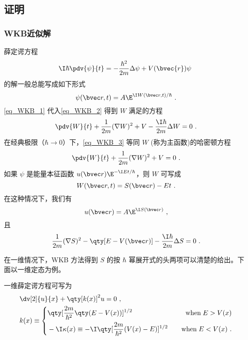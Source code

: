 \subsection{证明}
\subsubsection{WKB近似解}
薛定谔方程
\begin{equation}\label{eq_WKB_2}
\I\hbar\pdv{\psi}{t}=-\frac{\hbar^2}{2m}\Delta\psi+V(\bvec{r})\psi~
\end{equation}
的解一般总能写成如下形式
\begin{equation}\label{eq_WKB_1}
\psi(\bvec r,t)=A\E^{\I W(\bvec r,t)/\hbar}~.
\end{equation}
\autoref{eq_WKB_1} 代入\autoref{eq_WKB_2} 得到 $W$ 满足的方程
\begin{equation}\label{eq_WKB_3}
\pdv{W}{t}+\frac{1}{2m}(\nabla W)^2+V-\frac{\I\hbar}{2m}\Delta W=0~.
\end{equation}
在经典极限（$\hbar\rightarrow 0$）下，\autoref{eq_WKB_3} 等同 $W$ (称为主函数)的哈密顿方程
\begin{equation}
\pdv{W}{t}+\frac{1}{2m}(\nabla W)^2+V=0~.
\end{equation}
如果 $\psi$ 是能量本征函数 $u(\bvec r)\E^{-\I Et/\hbar}$，则 $W$ 可写成
\begin{equation}
W(\bvec r,t)=S(\bvec r)-Et~.
\end{equation}
在这种情况下，我们有
\begin{equation}
u(\bvec r)=A\E^{\I S(\bvec r)}~,
\end{equation}
且
\begin{equation}
\frac{1}{2m}(\nabla S)^2-\qty[E-V(\bvec r)]-\frac{\I\hbar}{2m}\Delta S=0~.
\end{equation}

在一维情况下，WKB 方法得到 $S$ 的按 $\hbar$ 幂展开式的头两项可以清楚的给出。下面以一维定态为例。

一维薛定谔方程可写为\cite{Sakurai}
\begin{equation}\label{eq_WKB_4}
\begin{aligned}
&\dv[2]{u}{x}+\qty[k(x)]^2u=0~,\\
&k(x)\equiv\left\{\begin{aligned}
&\qty[\frac{2m}{\hbar^2}\qty(E-V(x))]^{1/2}\quad &\text{when}\; E>V(x)\\
&-\I\kappa(x)\equiv-\I\qty[\frac{2m}{\hbar^2}(V(x)-E)]^{1/2}\quad &\text{when}\; E<V(x)~.
\end{aligned}\right.
\end{aligned}
\end{equation}

